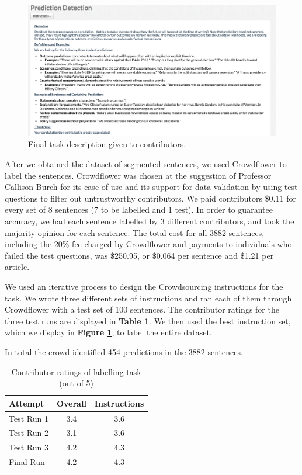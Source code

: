 \documentclass[11pt,letterpaper]{article}
\begin{document}
\begin{figure}[t]
\includegraphics[width=\textwidth]{taskdescription.png}
\centering
\caption{Final task description given to contributors.}
\label{description}
\end{figure}
After we obtained the dataset of segmented sentences, we used Crowdflower to label the sentences. Crowdflower was chosen at the suggestion of Professor Callison-Burch for its ease of use and its support for data validation by using test questions to filter out untrustworthy contributors. We paid contributors \$0.11 for every set of 8 sentences (7 to be labelled and 1 test). In order to guarantee accuracy, we had each sentence labelled by 3 different contributors, and took the majority opinion for each sentence. The total cost for all 3882 sentences, including the 20\% fee charged by Crowdflower and payments to individuals who failed the test questions, was \$250.95, or \$0.064 per sentence and \$1.21 per article. 

We used an iterative process to design the Crowdsourcing instructions for the task. We wrote three different sets of instructions and ran each of them through Crowdflower with a test set of 100 sentences. The contributor ratings for the three test runs are displayed in \textbf{Table \ref{ratings}}. We then used the best instruction set, which we display in \textbf{Figure \ref{description}}, to label the entire dataset. 

 In total the crowd identified 454 predictions in the 3882 sentences.  
\begin{table}
\centering
 \begin{tabular}{|l |c c |} 
 \hline
\textbf{ Attempt} & \textbf{Overall} & \textbf{Instructions}\\
 \hline
Test Run 1 & 3.4 & 3.6\\
Test Run 2 & 3.1 & 3.6\\
Test Run 3 & 4.2 &  4.3\\
Final Run & 4.2 & 4.3 \\
 \hline
 \end{tabular}
 \caption{Contributor ratings of labelling task (out of 5)}
 \label{ratings}
\end{table}
\end{document}
